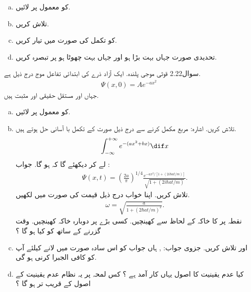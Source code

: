 \begin{enumerate}[a. ]
\item 
{} کو معمول پر لائیں. 
\item
{} تلاش کریں. 
\item
{} کو تکمل کی صورت میں تیار کریں. 
\item
تحدیدی صورت جہاں  بہت بڑا ہو اور جہاں  بہت چھوٹا ہو پر تبصرہ کریں. 
\end{enumerate}
سوال2.22
قوثی موجی پلندہ. ایک آزاد ذرے کی ابتدائی تفاعل موج درج ذیل ہے. 
\begin{align*}
\Psi(x,0) = A e^{-ax^{2}}
\end{align*}
جہاں  اور  مستقل حقیقی اور مثبت ہیں. 
\begin{enumerate}[a.]
\item
{} کو معمول پر لائیں. 
\item
{} تلاش کریں. اشارہ: مربع مکمل کرنے سے درج ذیل صورت کے تکمل با آسانی حل ہوتے ہیں. 
\begin{align*}
\int_{-\infty}^{+\infty} e^{-(ax^{2} +bx)} \dif x
\end{align*}
 لے کر دیکھئے گا کہ  ہو گا. جواب : 
\begin{align*}
\Psi(x,t) = \left( \frac{2a}{\pi} \right) ^{1/4} \frac{e^{-ax^{2}/[1+(2i\hbar at/m)]}}{\sqrt{1+(2i\hbar at/m)}}.
\end{align*}
 تلاش کریں. اپنا خواب درج ذیل قیمت کی صورت میں لکھیں. 
\begin{align*}
\omega = \sqrt{\frac{a}{1+(2\hbar at/m)^{2}}}.
\end{align*}
نقطہ  پر  کا خاکہ   کے لحاظ سے کھینچیں. کسی بڑے  پر دوبارہ خاکہ کھینچیں. وقت  گزرنے کے ساتھ   کو کیا ہو گا ؟
\item 
{} اور  تلاش کریں. جزوی جواب: , ہاں جواب کو  اس سادہ صورت میں لانے کیلئے آپ کو کافی الجبرا کرنی ہو گی. 
\item
کیا عدم یقینیت کا اصول یہاں کار آمد ہے ؟ کس لمحہ  پر یہ نظام عدم یقینیت کے اصول کے قریب تر ہو گا ؟
\end{enumerate}
